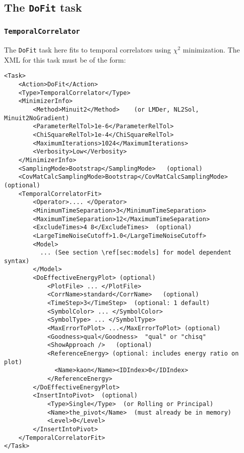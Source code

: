 \documentclass[12pt]{article}
\newcommand{\vb}{\texttt}
\begin{document}
\subsection{The \vb{DoFit} task}
\subsubsection{\vb{TemporalCorrelator}}
The \vb{DoFit} task here fits to temporal correlators using $\chi^2$ minimization.
The XML for this task must be of the form:

\begin{Verbatim}[commandchars=\\\[\]]
<Task>
    <Action>DoFit</Action>
    <Type>TemporalCorrelator</Type>
    <MinimizerInfo>
        <Method>Minuit2</Method>    (or LMDer, NL2Sol, Minuit2NoGradient)
        <ParameterRelTol>1e-6</ParameterRelTol>
        <ChiSquareRelTol>1e-4</ChiSquareRelTol>
        <MaximumIterations>1024</MaximumIterations>
        <Verbosity>Low</Verbosity>
    </MinimizerInfo>
    <SamplingMode>Bootstrap</SamplingMode>   (optional)
    <CovMatCalcSamplingMode>Bootstrap</CovMatCalcSamplingMode> (optional)
    <TemporalCorrelatorFit>
        <Operator>.... </Operator>
        <MinimumTimeSeparation>3</MinimumTimeSeparation>
        <MaximumTimeSeparation>12</MaximumTimeSeparation>
        <ExcludeTimes>4 8</ExcludeTimes>  (optional)
        <LargeTimeNoiseCutoff>1.0</LargeTimeNoiseCutoff>
        <Model>
          ... (See section \ref[sec:models] for model dependent syntax)
        </Model>
        <DoEffectiveEnergyPlot> (optional)
            <PlotFile> ... </PlotFile>
            <CorrName>standard</CorrName>   (optional)
            <TimeStep>3</TimeStep>  (optional: 1 default)
            <SymbolColor> ... </SymbolColor>
            <SymbolType> ... </SymbolType>
            <MaxErrorToPlot> ...</MaxErrorToPlot> (optional)
            <Goodness>qual</Goodness>  "qual" or "chisq"
            <ShowApproach />   (optional)
            <ReferenceEnergy> (optional: includes energy ratio on plot)
              <Name>kaon</Name><IDIndex>0</IDIndex>
            </ReferenceEnergy>
        </DoEffectiveEnergyPlot>
        <InsertIntoPivot>  (optional)
            <Type>Single</Type>  (or Rolling or Principal)
            <Name>the_pivot</Name>  (must already be in memory)
            <Level>0</Level>
        </InsertIntoPivot>
    </TemporalCorrelatorFit>
</Task>
\end{Verbatim}
\end{document}
